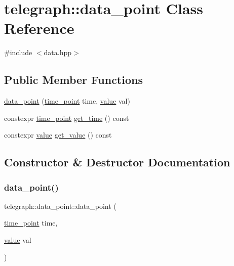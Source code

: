 \hypertarget{classtelegraph_1_1data__point}{}\section{telegraph\+:\+:data\+\_\+point Class Reference}
\label{classtelegraph_1_1data__point}


{\ttfamily \#include $<$data.\+hpp$>$}

\subsection*{Public Member Functions}
\begin{DoxyCompactItemize}
\item 
\hyperlink{classtelegraph_1_1data__point_a58c28678c77cd8b140913d53add6fef9}{data\+\_\+point} (\hyperlink{namespacetelegraph_a0f1714084e0d249aa06f757c9159c0ca}{time\+\_\+point} time, \hyperlink{classtelegraph_1_1value}{value} val)
\item 
constexpr \hyperlink{namespacetelegraph_a0f1714084e0d249aa06f757c9159c0ca}{time\+\_\+point} \hyperlink{classtelegraph_1_1data__point_a03075d4e2943d51fe6c411897df8d443}{get\+\_\+time} () const
\item 
constexpr \hyperlink{classtelegraph_1_1value}{value} \hyperlink{classtelegraph_1_1data__point_a93a646507e5a1bccbffa96ced8770992}{get\+\_\+value} () const
\end{DoxyCompactItemize}


\subsection{Constructor \& Destructor Documentation}
\mbox{\label{classtelegraph_1_1data__point_a58c28678c77cd8b140913d53add6fef9}} 
\subsubsection{\texorpdfstring{data\+\_\+point()}{data\_point()}}
{\footnotesize\ttfamily telegraph\+::data\+\_\+point\+::data\+\_\+point (\begin{DoxyParamCaption}\item[{\hyperlink{namespacetelegraph_a0f1714084e0d249aa06f757c9159c0ca}{time\+\_\+point}}]{time,  }\item[{\hyperlink{classtelegraph_1_1value}{value}}]{val }\end{DoxyParamCaption})\hspace{0.3cm}{\ttfamily [inline]}}



